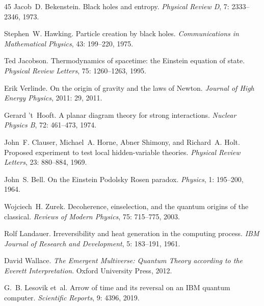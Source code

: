 \documentclass[11pt,a4paper]{article}
\theoremstyle{plain}
\theoremstyle{definition}
\theoremstyle{remark}
\begin{document}
\begin{thebibliography}{45}
Jacob~D. Bekenstein.
\newblock Black holes and entropy.
\newblock \emph{Physical Review D}, 7: 2333--2346, 1973.

Stephen~W. Hawking.
\newblock Particle creation by black holes.
\newblock \emph{Communications in Mathematical Physics}, 43: 199--220,
  1975.

Ted Jacobson.
\newblock Thermodynamics of spacetime: the {E}instein equation of state.
\newblock \emph{Physical Review Letters}, 75: 1260--1263, 1995.

Erik Verlinde.
\newblock On the origin of gravity and the laws of {N}ewton.
\newblock \emph{Journal of High Energy Physics}, 2011: 29, 2011.

Gerard 't~Hooft.
\newblock A planar diagram theory for strong interactions.
\newblock \emph{Nuclear Physics B}, 72: 461--473, 1974.

John~F. Clauser, Michael~A. Horne, Abner Shimony, and Richard~A. Holt.
\newblock Proposed experiment to test local hidden-variable theories.
\newblock \emph{Physical Review Letters}, 23: 880--884, 1969.

John~S. Bell.
\newblock On the {E}instein {P}odolsky {R}osen paradox.
\newblock \emph{Physics}, 1: 195--200, 1964.

Wojciech~H. Zurek.
\newblock Decoherence, einselection, and the quantum origins of the classical.
\newblock \emph{Reviews of Modern Physics}, 75: 715--775, 2003.

Rolf Landauer.
\newblock Irreversibility and heat generation in the computing process.
\newblock \emph{IBM Journal of Research and Development}, 5: 183--191,
  1961.

David Wallace.
\newblock \emph{The Emergent Multiverse: Quantum Theory according to the
  {E}verett Interpretation}.
\newblock Oxford University Press, 2012.

G.~B. Lesovik et~al.
\newblock Arrow of time and its reversal on an {IBM} quantum computer.
\newblock \emph{Scientific Reports}, 9: 4396, 2019.


\end{thebibliography}
\end{document}
